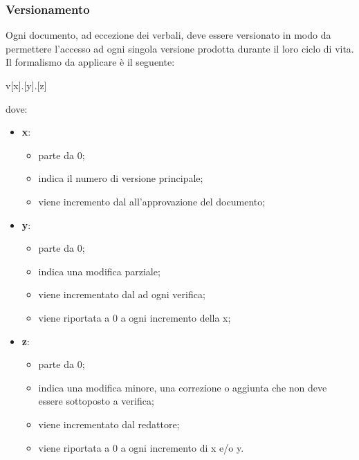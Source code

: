         \subsubsection{Versionamento}
        Ogni documento, ad eccezione dei verbali, deve essere versionato in modo da permettere l'accesso ad ogni singola versione prodotta durante il loro ciclo di vita.
        Il formalismo da applicare è il seguente:
            \begin{center}v[x].[y].[z]\end{center}
        dove:
            \begin{itemize}
                \item\textbf{x}: 
                    \begin{itemize}
                        \item parte da 0;
                        \item indica il numero di versione principale;
                        \item viene incremento dal \roleProjectManagerP{} all'approvazione del documento; 
                    \end{itemize}
                \item\textbf{y}: 
                    \begin{itemize}
                        \item parte da 0;
                        \item indica una modifica parziale;
                        \item viene incrementato dal \roleVerifier{} ad ogni verifica;
                        \item viene riportata a 0 a ogni incremento della x;
                    \end{itemize}
                \item\textbf{z}:
                    \begin{itemize}
                        \item parte da 0;
                        \item indica una modifica minore, una correzione o aggiunta che non deve essere sottoposto a verifica;
                        \item viene incrementato dal redattore;
                        \item viene riportata a 0 a ogni incremento di x e/o y.
                    \end{itemize}
            \end{itemize}

